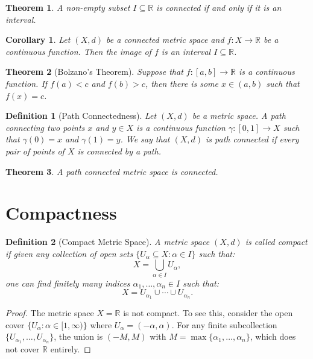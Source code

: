 \documentclass{article}
\newtheorem{definition}{Definition}
\newtheorem{theorem}{Theorem}
\newtheorem{corollary}{Corollary}
\begin{document}
\begin{theorem}
A non-empty subset $I \subseteq \mathbb{R}$ is connected if and only if it is an interval.
\end{theorem}

\begin{corollary}
Let $(X, d)$ be a connected metric space and $f : X \to \mathbb{R}$ be a continuous function. Then the image of $f$ is an interval $I \subseteq \mathbb{R}$.
\end{corollary}

\begin{theorem}[Bolzano's Theorem]
Suppose that $f : [a, b] \to \mathbb{R}$ is a continuous function. If $f(a) < c$ and $f(b) > c$, then there is some $x \in (a, b)$ such that $f(x) = c$.
\end{theorem}

\begin{definition}[Path Connectedness]
Let $(X, d)$ be a metric space. A path connecting two points $x$ and $y \in X$ is a continuous function $\gamma : [0, 1] \to X$ such that $\gamma(0) = x$ and $\gamma(1) = y$. We say that $(X, d)$ is path connected if every pair of points of $X$ is connected by a path.
\end{definition}

\begin{theorem}
A path connected metric space is connected.
\end{theorem}

\section*{Compactness}

\begin{definition}[Compact Metric Space]
A metric space $(X, d)$ is called compact if given any collection of open sets $\{U_\alpha \subseteq X : \alpha \in I\}$ such that:
\[
X = \bigcup_{\alpha \in I} U_\alpha,
\]
one can find finitely many indices $\alpha_1, \ldots, \alpha_n \in I$ such that:
\[
X = U_{\alpha_1} \cup \cdots \cup U_{\alpha_n}.
\]
\end{definition}

\begin{proof}
The metric space $X = \mathbb{R}$ is not compact. To see this, consider the open cover $\{U_\alpha : \alpha \in [1, \infty)\}$ where $U_\alpha = (-\alpha, \alpha)$. For any finite subcollection $\{U_{\alpha_1}, \ldots, U_{\alpha_n}\}$, the union is $(-M, M)$ with $M = \max\{\alpha_1, \ldots, \alpha_n\}$, which does not cover $\mathbb{R}$ entirely.
\end{proof}
\end{document}
